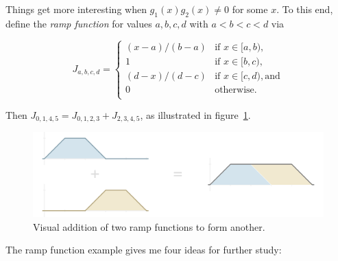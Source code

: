 \documentclass[20pt,]{extarticle}
\begin{document}
Things get more interesting when \(g_1(x) g_2(x) \ne 0\) for some \(x\).
To this end, define the \emph{ramp function} for values \(a,b,c,d\) with
\(a < b < c < d\) via

\[ J_{a,b,c,d} = \begin{cases}
(x - a) / (b - a) & \text{if } x \in [a, b), \\
1 & \text{if } x \in [b, c), \\
(d - x) / (d - c) & \text{if } x \in [c, d), \text{and} \\
0 & \text{otherwise.} \\
\end{cases}\]

Then \(J_{0,1,4,5} = J_{0,1,2,3} + J_{2,3,4,5}\), as illustrated in
figure~\ref{fig:ramp_fns}.

\begin{figure}
\centering
\includegraphics{images/ramp_fns3.png}
\caption{Visual addition of two ramp functions to form
another.}\label{fig:ramp_fns}
\end{figure}

The ramp function example gives me four ideas for further study:
\end{document}
